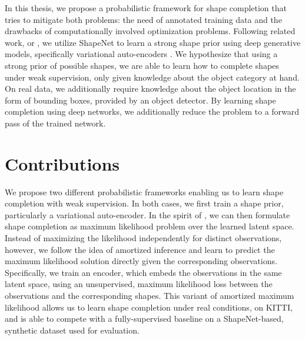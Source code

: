 In this thesis, we propose a probabilistic framework for shape completion
that tries to mitigate both problems: the need of annotated training data
and the drawbacks of computationally involved optimization problems.
Following related work, \eg
\cite{SmithMeger:2017,GirdharGupta:2016,DaiNiessner:2016,
SharmaFritz:2016,BrockWeston:2016,WuSongXiao:2015} or \cite{WuTenenbaum:2016},
we utilize ShapeNet to learn
a strong shape prior using deep generative models, specifically variational
auto-encoders \cite{KingmaWelling:2013}. We hypothesize that using a strong
prior of possible shapes, we are able to learn how to complete shapes
under weak supervision, \ie only given knowledge about the object category
at hand. On real data, we additionally require knowledge about the object location
in the form of bounding boxes, \eg provided by an object detector.
By learning shape completion
using deep networks, we additionally reduce the problem to a forward pass
of the trained network.

\section{Contributions}

We propose two different probabilistic frameworks enabling us to learn
shape completion with weak supervision. In both cases, we first train
a shape prior, particularly a variational auto-encoder.
In the spirit of \cite{EngelmannStuecklerLeibe:2016}, we can then formulate
shape completion as maximum likelihood problem over the learned latent space.
Instead of maximizing the likelihood independently for distinct observations,
however, we follow the idea of amortized inference \cite{GershamGoodman:2014}
and learn to predict the maximum likelihood solution directly given the
corresponding observations. Specifically, we train an encoder,
which embeds the observations in the same latent space, using an unsupervised,
maximum likelihood loss between the observations and the corresponding shapes.
This variant of amortized maximum likelihood allows us to learn shape completion
under real conditions, \eg on KITTI,
and is able to compete with a fully-supervised baseline on a ShapeNet-based, synthetic dataset used for evaluation.

